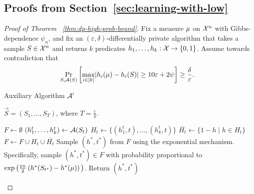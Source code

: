 \documentclass[12pt,a4paper,oneside,onecolumn]{book}
\begin{document}
\subsection{Proofs from Section~\ref{sec:learning-with-low}}

\begin{proof}[Proof of Theorem ~\ref{thm:dp-high-prob-bound}]
  Fix a measure $\mu$ on $\mathcal{X}^n$ with Gibbs-dependence $\psi_n$, and fix an $(\varepsilon,\delta)$-differentially private algorithm that takes a sample $S\in\mathcal{X}^n$ and returns $k$ predicates $h_1,\dots,h_k:\mathcal{X}\rightarrow\{0,1\}$. Assume towards contradiction that
  \begin{equation}
    \label{eq:3}
    \Pr_{S,\mathcal{A}(S)}\left[
      \max_{i\in [k]}\lvert h_i(\mu)-h_i(S)\rvert\geq 10\varepsilon + 2\psi
    \right]
    \geq \frac{\delta}{\varepsilon}.
  \end{equation}


\begin{algorithm}[tb]
   \caption{Auxiliary Algorithm $\mathcal{A}'$}
    \label{alg:contra-alg}
\begin{algorithmic}
    $\vec{S}=(S_1,\ldots,S_T)$, where $T=\frac{\varepsilon}{\delta}$.

\State $F \leftarrow \emptyset$ 
   \State $(h^t_1,\ldots,h^t_k) \leftarrow \mathcal{A}(S_t)$
   \State $H_t \leftarrow \{(h^t_1,t),\ldots,(h^t_k,t)\}$
   \State $\bar{H_t} \leftarrow \{1-h\mid h\in H_t\}$
   \State $F \leftarrow F \cup H_t \cup \bar{H_t}$
   \EndFor
   \State Sample $(h^*,t^*)$ from $F$ using the exponential mechanism. Specifically, sample $(h^*,t^*)\in F$ with probability proportional to $\exp\big(\frac{\varepsilon n}{2}\left(h^*(S_{t^*})-h^*(\mu)\right)\big)$.
   \State Return $(h^*,t^*)$
\end{algorithmic}
\end{algorithm}


\end{proof}
\end{document}
